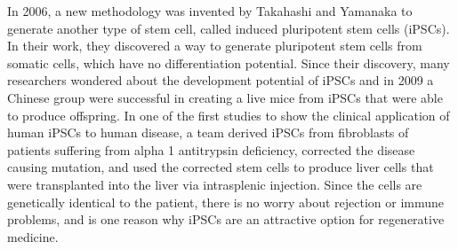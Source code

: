 In 2006, a new methodology was invented by Takahashi and Yamanaka to generate another type of stem cell, called induced pluripotent stem cells (iPSCs)\cite{pmid16904174}. In their work, they discovered a way to generate pluripotent stem cells from somatic cells, which have no differentiation potential. Since their discovery, many researchers wondered about the development potential of iPSCs and in 2009 a Chinese group were successful in creating a live mice from iPSCs that were able to produce offspring\cite{pmid19672241}. In one of the first studies to show the clinical application of human iPSCs to human disease, a team derived iPSCs from fibroblasts of patients suffering from alpha 1 antitrypsin deficiency, corrected the disease causing mutation, and used the corrected stem cells to produce liver cells that were transplanted into the liver via intrasplenic injection\cite{pmid21993621}. Since the cells are genetically identical to the patient, there is no worry about rejection or immune problems, and is one reason why iPSCs are an attractive option for regenerative medicine.
